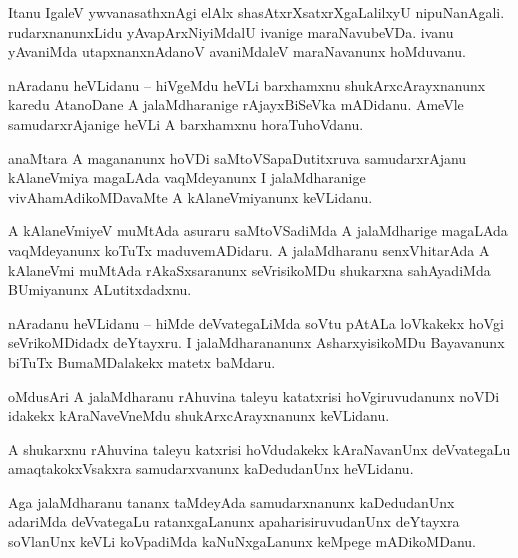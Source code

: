 \documentclass{article}
\begin{document}
\begin{mn}%
Itanu IgaleV ywvanasathxnAgi elAlx shasAtxrXsatxrXgaLalilxyU nipuNanAgali. rudarxnanunxLidu 
yAvapArxNiyiMdalU ivanige maraNavubeVDa. ivanu yAvaniMda utapxnanxnAdanoV avaniMdaleV maraNavanunx 
hoMduvanu.
\end{mn}

\begin{mn}%
nAradanu heVLidanu -- hiVgeMdu heVLi barxhamxnu shukArxcArayxnanunx karedu AtanoDane A 
jalaMdharanige rAjayxBiSeVka mADidanu. AmeVle samudarxrAjanige heVLi A barxhamxnu horaTuhoVdanu.
\end{mn}

\begin{mn}%
anaMtara A magananunx hoVDi saMtoVSapaDutitxruva samudarxrAjanu kAlaneVmiya magaLAda vaqMdeyanunx I 
jalaMdharanige vivAhamAdikoMDavaMte A kAlaneVmiyanunx keVLidanu.
\end{mn}

\begin{mn}%
A kAlaneVmiyeV muMtAda asuraru saMtoVSadiMda A jalaMdharige magaLAda vaqMdeyanunx koTuTx 
maduvemADidaru. A jalaMdharanu senxVhitarAda A kAlaneVmi muMtAda rAkaSxsaranunx seVrisikoMDu 
shukarxna sahAyadiMda BUmiyanunx ALutitxdadxnu.
\end{mn}


\begin{mn}%
nAradanu heVLidanu -- hiMde deVvategaLiMda soVtu pAtALa loVkakekx hoVgi seVrikoMDidadx deYtayxru. I 
jalaMdharananunx AsharxyisikoMDu Bayavanunx biTuTx BumaMDalakekx matetx baMdaru.
\end{mn}

\begin{mn}%
oMdusAri A jalaMdharanu rAhuvina taleyu katatxrisi hoVgiruvudanunx noVDi idakekx kAraNaveVneMdu 
shukArxcArayxnanunx keVLidanu.
\end{mn}

\begin{mn}%
A shukarxnu rAhuvina taleyu katxrisi hoVdudakekx kAraNavanUnx deVvategaLu amaqtakokxVsakxra 
samudarxvanunx kaDedudanUnx heVLidanu.
\end{mn}

\begin{mn}%
Aga jalaMdharanu tananx taMdeyAda samudarxnanunx kaDedudanUnx adariMda deVvategaLu ratanxgaLanunx 
apaharisiruvudanUnx deYtayxra soVlanUnx keVLi koVpadiMda kaNuNxgaLanunx keMpege mADikoMDanu.
\end{mn}
\end{document}
